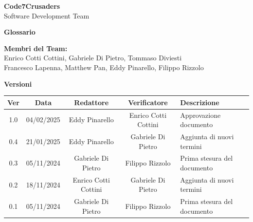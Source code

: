 \documentclass{article}
\begin{document}
\begin{titlepage}
    {\Huge \textbf{Code7Crusaders}}\\
    \vspace{0.5cm}
    {\Large Software Development Team}\\
    \vspace{2cm}
    
    \large \textbf{Glossario}
    \vspace{3.9cm}

    \textbf{Membri del Team:}\\
    Enrico Cotti Cottini, Gabriele Di Pietro, Tommaso Diviesti \\
    Francesco Lapenna, Matthew Pan, Eddy Pinarello, Filippo Rizzolo \\
    \vspace{0.5cm}
    
    \vspace{1cm}
\end{titlepage}



\newpage
\begin{center}
    \textbf{Versioni}
    \\
    \vspace{0.3cm}
    \begin{tabular}{|c|c|c|c|p{5cm}|}
        \hline
        \textbf{Ver} & \textbf{Data} & \textbf{Redattore} & \textbf{Verificatore} & \textbf{Descrizione} \\
        \hline
        1.0 & 04/02/2025 & Eddy Pinarello & Enrico Cotti Cottini & Approvazione documento \\
        0.4 & 21/01/2025 & Eddy Pinarello & Gabriele Di Pietro & Aggiunta di nuovi termini \\
        0.3 & 05/11/2024 & Gabriele Di Pietro & Filippo Rizzolo & Prima stesura del documento \\
        0.2 & 18/11/2024 & Enrico Cotti Cottini & Gabriele Di Pietro & Aggiunta di nuovi termini \\
        0.1 & 05/11/2024 & Gabriele Di Pietro & Filippo Rizzolo & Prima stesura del documento \\
        \hline
    \end{tabular}
\end{center}

\newpage
\tableofcontents
\newpage

\end{document}
